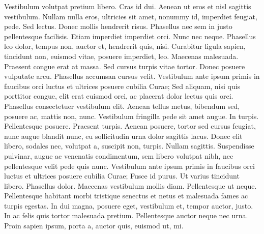 Vestibulum volutpat pretium libero. Cras id dui. Aenean ut eros et nisl sagittis vestibulum. Nullam nulla eros, ultricies sit amet, nonummy id, imperdiet feugiat, pede. Sed lectus. Donec mollis hendrerit risus. Phasellus nec sem in justo pellentesque facilisis. Etiam imperdiet imperdiet orci. Nunc nec neque. Phasellus leo dolor, tempus non, auctor et, hendrerit quis, nisi. Curabitur ligula sapien, tincidunt non, euismod vitae, posuere imperdiet, leo. Maecenas malesuada. Praesent congue erat at massa. Sed cursus turpis vitae tortor. Donec posuere vulputate arcu. Phasellus accumsan cursus velit. Vestibulum ante ipsum primis in faucibus orci luctus et ultrices posuere cubilia Curae; Sed aliquam, nisi quis porttitor congue, elit erat euismod orci, ac placerat dolor lectus quis orci. Phasellus consectetuer vestibulum elit. Aenean tellus metus, bibendum sed, posuere ac, mattis non, nunc. Vestibulum fringilla pede sit amet augue. In turpis. Pellentesque posuere. Praesent turpis. Aenean posuere, tortor sed cursus feugiat, nunc augue blandit nunc, eu sollicitudin urna dolor sagittis lacus. Donec elit libero, sodales nec, volutpat a, suscipit non, turpis. Nullam sagittis. Suspendisse pulvinar, augue ac venenatis condimentum, sem libero volutpat nibh, nec pellentesque velit pede quis nunc. Vestibulum ante ipsum primis in faucibus orci luctus et ultrices posuere cubilia Curae; Fusce id purus. Ut varius tincidunt libero. Phasellus dolor. Maecenas vestibulum mollis diam. Pellentesque ut neque. Pellentesque habitant morbi tristique senectus et netus et malesuada fames ac turpis egestas. In dui magna, posuere eget, vestibulum et, tempor auctor, justo. In ac felis quis tortor malesuada pretium. Pellentesque auctor neque nec urna. Proin sapien ipsum, porta a, auctor quis, euismod ut, mi.